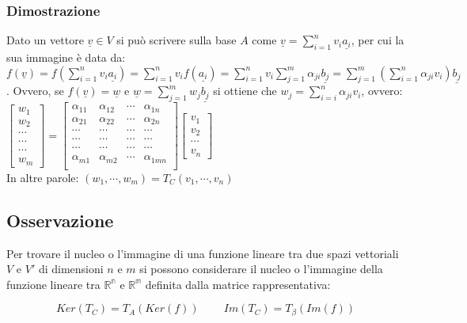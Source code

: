 \subsubsection{Dimostrazione}
Dato un vettore $\underline{v}\in V$ si pu\`o scrivere sulla base $A$ come $\underline{v}=\sum\limits_{i=1}^nv_i\underline{a_i}$, per cui la sua immagine \`e data da: 
$f(\underline{v})=f(\sum\limits_{i=1}^nv_i\underline{a_i})=\sum\limits_{i=1}^nv_if(\underline{a_i})=\sum\limits_{i=1}^nv_i\sum\limits_{j=1}^m\alpha_{ji}\underline{b_j}=
\sum\limits_{j=1}^m(\sum\limits_{i=1}^n\alpha_{ji}v_i)\underline{b_j}$. Ovvero, se $f(\underline{v})=\underline{w}$ e $\underline{w}=\sum\limits_{j=1}^mw_j\underline{b_j}$ si
ottiene che $w_j=\sum\limits_{i=i}^n\alpha_{ji}v_i$, ovvero: \\
$
\left[\begin{matrix}
w_1\\
w_2\\
\cdots\\
\cdots\\
\cdots\\
w_m
\end{matrix}\right]
=
\left[\begin{matrix}
\alpha_{11} & \alpha_{12}& \cdots &\alpha_{1n}\\
\alpha_{21} & \alpha_{22}& \cdots &\alpha_{2n}\\
\cdots & \cdots & \cdots &\cdots\\
\cdots & \cdots & \cdots &\cdots\\
\cdots & \cdots & \cdots &\cdots\\
\alpha_{m1} & \alpha_{m2}& \cdots &\alpha_{1mn}\\
\end{matrix}\right]
\left[\begin{matrix}
v_1\\
v_2\\
\cdots\\
v_n
\end{matrix}\right]
$\\
In altre parole: $(w_1,\cdots, w_m)=T_C(v_1,\cdots,v_n)$
\subsection{Osservazione}
Per trovare il nucleo o l'immagine di una funzione lineare tra due spazi vettoriali $V$ e $V'$ di dimensioni $n$ e $m$ si possono considerare il nucleo o l'immagine  della 
funzione lineare tra $\mathbb{R^n}$ e $\mathbb{R^m}$ definita dalla matrice rappresentativa:
\begin{center}
\begin{equation}
Ker(T_C)=T_A(Ker(f))\;\;\;\;\;\;\;\;Im(T_C)=T_\beta(Im(f))
\end{equation}
\end{center}
